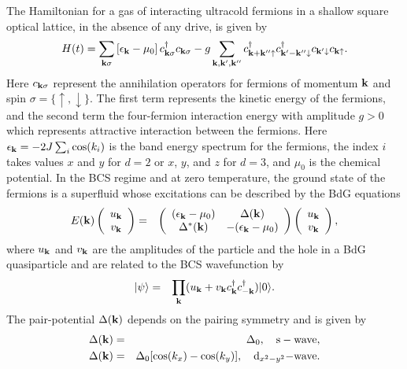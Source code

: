 \documentclass[a4paper,10pt]{report}
\begin{document}
The Hamiltonian for a gas of interacting ultracold fermions in a shallow square optical lattice, in
the absence of any drive, is given by
\begin{equation}
H(t) = \sum_{{\bf k}\sigma} \left[ \epsilon_{\bf
k}-\mu_0\right]c^\dagger_{{\bf k}\sigma}c_{{\bf k}\sigma} -g \sum_{{\bf k}, {\bf k'},{\bf k''}} c^\dagger_{{\bf k}+{\bf
k''}\uparrow} c^\dagger_{{\bf k'}-{\bf k''}\downarrow} c_{{\bf
k'}\downarrow} c_{{\bf k}\uparrow}. \label{fermiham}
\end{equation}
Here $c_{{\bf k}\sigma}$ represent the annihilation operators for fermions of momentum ${\bf k}$ and spin $\sigma=\{\uparrow,
\downarrow\}$. The first term represents the kinetic energy of the fermions, and the second term the four-fermion interaction energy
with amplitude $g>0$ which represents attractive interaction between the fermions. Here $\epsilon_{\bf k}= -2J \sum_{i}\cos(k_i)$ is the
band energy spectrum for the fermions, the index $i$ takes values $x$ and $y$ for $d=2$ or $x$, $y$, and $z$ for $d=3$, and $\mu_0$ is
the chemical potential. In the BCS regime and at zero temperature,
the ground state of the fermions is a superfluid whose excitations
can be described by the BdG equations
\begin{eqnarray}
E({\bf k})\left(\begin{array}{c} u_{\bf k} \\ v_{\bf k}
\end{array} \right) &=& \left(
\begin{array}{cc}
(\epsilon_{\bf k}-\mu_0) & \Delta({\bf k})\\
\Delta^{\ast}({\bf k}) & -(\epsilon_{\bf k}-\mu_0)
\end{array} \right) \left(\begin{array}{c} u_{\bf k} \\ v_{\bf k}
\end{array} \right), \nonumber\\ \label{bdg1}
\end{eqnarray}
where $u_{\bf k}$ and $v_{\bf k}$ are the amplitudes of the particle
and the hole in a BdG quasiparticle and are related to the BCS
wavefunction by
\begin{eqnarray}
|\psi\rangle &=& \prod_{\bf k} (u_{\bf k} + v_{\bf k} c_{\bf
k}^{\dagger} c_{{\bf -k}}^{\dagger}) |0\rangle. \label{bcswav}
\end{eqnarray}
The pair-potential $\Delta({\bf k})$ depends on the pairing symmetry
and is given by
\begin{eqnarray}
\Delta({\bf k}) &=& \Delta_0, \quad {\rm s-wave }, \nonumber\\
\Delta({\bf k}) &=& \Delta_0 [\cos(k_x) -\cos(k_y)],  \quad {\rm
d}_{x^2-y^2}{\rm -wave}. \label{pp}
\end{eqnarray}
\end{document}
